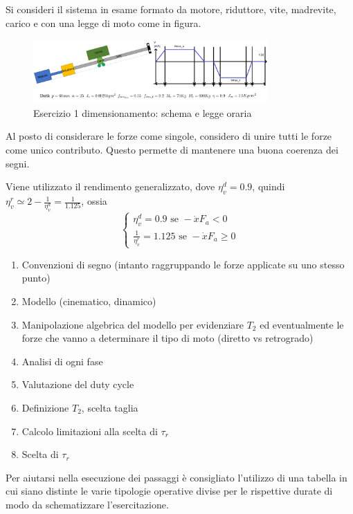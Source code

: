 Si consideri il sistema in esame formato da motore, riduttore, vite, madrevite, carico e con una legge di moto come in figura.\label{EsercizioDimRid}

\begin{figure}[h]
    \centering
    \includegraphics[width=0.8\textwidth]{Immagini/esercizio1_dim_rid_vite.png}
    \caption{Esercizio 1 dimensionamento: schema e legge oraria}
\end{figure}

Al posto di considerare le forze come singole, considero di unire tutti le forze come unico contributo. Questo permette di mantenere una buona coerenza dei segni.

Viene utilizzato il rendimento generalizzato, dove \(\eta_v^d=0.9\), quindi \(\eta_v^r \simeq 2-\frac{1}{\eta_v^d}=\frac{1}{1.125}\), ossia 
\[
\begin{cases}
    \eta_v^d = 0.9 \text{ \ se \ } -\dot{x}F_a < 0 \\
    \frac{1}{\eta_v^r} = 1.125  \text{ \ se \ } -\dot{x}F_a \geqslant 0
\end{cases}
\]

\begin{enumerate}[label=(\roman*)]
    \item Convenzioni di segno (intanto raggruppando le forze applicate su uno stesso punto)
    \item Modello (cinematico, dinamico)
    \item Manipolazione algebrica del modello per evidenziare $T_2$ ed eventualmente le forze che vanno a determinare il tipo di moto (diretto vs retrogrado)
    \item Analisi di ogni fase
    \item Valutazione del duty cycle
    \item Definizione $T_2$, scelta taglia
    \item Calcolo limitazioni alla scelta di $\tau_r$
    \item Scelta di $\tau_r$
\end{enumerate}

Per aiutarsi nella esecuzione dei passaggi è consigliato l'utilizzo di una tabella in cui siano distinte le varie tipologie operative divise per le rispettive durate di modo da schematizzare l'esercitazione.


